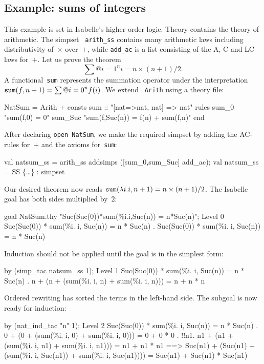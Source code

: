 \subsection{Example: sums of integers}
This example is set in Isabelle's higher-order logic.  Theory
 contains the theory of arithmetic.  The simpset {\tt
  arith_ss} contains many arithmetic laws including distributivity
of~$\times$ over~$+$, while {\tt add_ac} is a list consisting of the A, C
and LC laws for~$+$.  Let us prove the theorem 
\[ \sum@{i=1}^n i = n\times(n+1)/2. \]
%
A functional~{\tt sum} represents the summation operator under the
interpretation ${\tt sum}(f,n+1) = \sum@{i=0}^n f(i)$.  We extend {\tt
  Arith} using a theory file:
\begin{ttbox}
NatSum = Arith +
consts sum     :: "[nat=>nat, nat] => nat"
rules  sum_0      "sum(f,0) = 0"
       sum_Suc    "sum(f,Suc(n)) = f(n) + sum(f,n)"
end
\end{ttbox}
After declaring {\tt open NatSum}, we make the required simpset by adding
the AC-rules for~$+$ and the axioms for~{\tt sum}:
\begin{ttbox}
val natsum_ss = arith_ss addsimps ([sum_0,sum_Suc] \at add_ac);
{\out val natsum_ss = SS \{\ldots\} : simpset}
\end{ttbox}
Our desired theorem now reads ${\tt sum}(\lambda i.i,n+1) =
n\times(n+1)/2$.  The Isabelle goal has both sides multiplied by~$2$:
\begin{ttbox}
goal NatSum.thy "Suc(Suc(0))*sum(\%i.i,Suc(n)) = n*Suc(n)";
{\out Level 0}
{\out Suc(Suc(0)) * sum(\%i. i, Suc(n)) = n * Suc(n)}
{. Suc(Suc(0)) * sum(\%i. i, Suc(n)) = n * Suc(n)}
\end{ttbox}
Induction should not be applied until the goal is in the simplest form:
\begin{ttbox}
by (simp_tac natsum_ss 1);
{\out Level 1}
{\out Suc(Suc(0)) * sum(\%i. i, Suc(n)) = n * Suc(n)}
{. n + (n + (sum(\%i. i, n) + sum(\%i. i, n))) = n + n * n}
\end{ttbox}
Ordered rewriting has sorted the terms in the left-hand side.
The subgoal is now ready for induction:
\begin{ttbox}
by (nat_ind_tac "n" 1);
{\out Level 2}
{\out Suc(Suc(0)) * sum(\%i. i, Suc(n)) = n * Suc(n)}
{. 0 + (0 + (sum(\%i. i, 0) + sum(\%i. i, 0))) = 0 + 0 * 0}
\ttbreak
{. !!n1. n1 + (n1 + (sum(\%i. i, n1) + sum(\%i. i, n1))) =}
{\out           n1 + n1 * n1 ==>}
{\out           Suc(n1) +}
{\out           (Suc(n1) + (sum(\%i. i, Suc(n1)) + sum(\%i. i, Suc(n1)))) =}
{\out           Suc(n1) + Suc(n1) * Suc(n1)}
\end{ttbox}
